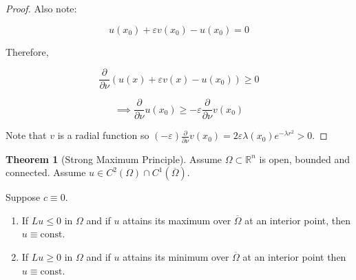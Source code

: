 \documentclass{article}
\theoremstyle{definition}
\newtheorem{theorem}{Theorem}
\begin{document}
\begin{proof}
    Also note:

    \[
        u(x_0) + \varepsilon v(x_0) - u(x_0) = 0
    \]

    Therefore,

    \[
        \frac{\partial}{\partial \nu} (u(x) + \varepsilon v(x) - u(x_0)) \geq 0
    \]

    \[
        \implies \frac{\partial}{\partial \nu} u(x_{0}) \geq - \varepsilon \frac{\partial}{\partial \nu } v(x_0)
    \]

    Note that \(v\) is a radial function so \((-\varepsilon)\frac{\partial}{\partial \nu} v(x_0) = 2 \varepsilon \lambda (x_0) e^{-\lambda r^2} > 0\). 

\end{proof}

\begin{theorem}
    [Strong Maximum Principle]

    Assume \(\Omega \subset \mathbb{R}^n\) is open, bounded and connected. Assume \(u\in C^2(\Omega) \cap C^1(\overline{\Omega})\). 

    Suppose \(c\equiv 0\). 

    \begin{enumerate}[label=\roman*)]
        \item If \(L u \leq 0\) in \(\Omega\) and if \(u\) attains its maximum over \(\overline{\Omega}\) at an interior point, then \(u\equiv \text{const}\).
        \item If \(L u \geq 0\) in \(\Omega\) and if \(u\) attains its minimum over \(\overline{\Omega} \) at an interior point then \(u\equiv \text{const}\). 
    \end{enumerate} 
\end{theorem}
\end{document}
